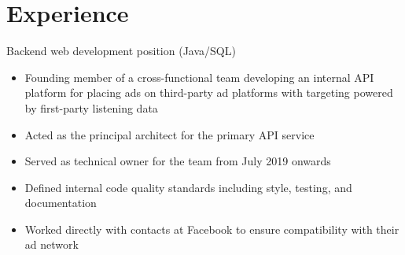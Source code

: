 



\makecvtitle


\section{Experience}
	{Backend web development position (Java/SQL)}{
	\begin{itemize}
	\item Founding member of a cross-functional team developing an internal API platform for placing ads on third-party ad platforms with targeting powered by first-party listening data
	\item Acted as the principal architect for the primary API service
	\item Served as technical owner for the team from July 2019 onwards
	\item Defined internal code quality standards including style, testing, and documentation
	\item Worked directly with contacts at Facebook to ensure compatibility with their ad network
	\end{itemize}
}

